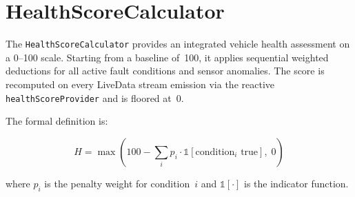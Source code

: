 \section{HealthScoreCalculator}
\label{sec:healthscore}

The \texttt{HealthScoreCalculator} provides an integrated vehicle health assessment on a 0--100 scale.
Starting from a baseline of~100, it applies sequential weighted deductions for all active fault conditions and sensor anomalies.
The score is recomputed on every LiveData stream emission via the reactive \texttt{healthScoreProvider} and is floored at~0.

The formal definition is:

\begin{equation}
\label{eq:healthscore}
H = \max\!\left(100 - \sum_{i} p_i \cdot \mathbb{1}[\text{condition}_i\text{ true}],\; 0\right)
\end{equation}

\noindent where $p_i$ is the penalty weight for condition~$i$ and $\mathbb{1}[\cdot]$ is the indicator function.


